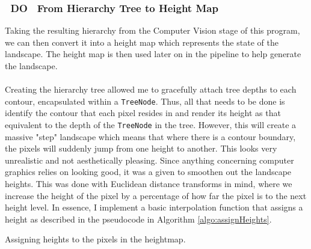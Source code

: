 \documentclass[11pt]{article}
\begin{document}
\subsubsection{~DO~ From Hierarchy Tree to Height Map}
Taking the resulting hierarchy from the Computer Vision stage of this
program, we can then convert it into a height map which represents the
state of the landscape. The height map is then used later on in the pipeline
to help generate the landscape.\\
\\
Creating the hierarchy tree allowed me to gracefully attach tree
depths to each contour, encapsulated within a \texttt{TreeNode}. Thus,
all that needs to be done is identify the contour that each pixel resides
in and render its height as that equivalent to the depth of the 
\texttt{TreeNode} in the tree. However, this will create a massive "step"
landscape which means that where there is a contour boundary, the
pixels will suddenly jump from one height to another. This looks very
unrealistic and not aesthetically pleasing. Since anything concerning
computer graphics relies on looking good, it was a given to smoothen out
the landscape heights. This was done with Euclidean distance transforms 
in mind, where we increase the height of the pixel by a percentage of how
far the pixel is to the next height level. In essence, I implement a 
basic interpolation function that assigns a height as described in the 
pseudocode in Algorithm \ref{algo:assignHeights}.

\begin{algorithm}
\DontPrintSemicolon
{}
\caption{Assigning heights to the pixels in the heightmap.}
\label{algo:assignHeights}
\end{algorithm}
\end{document}
